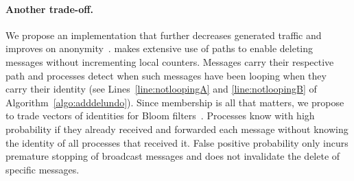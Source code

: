 


\paragraph{Another trade-off.}
We propose an implementation that further decreases generated traffic
and improves on anonymity~\cite{whitaker2002forwarding}.  \NAME makes
extensive use of paths to enable deleting messages without
incrementing local counters. Messages carry their respective path and
processes detect when such messages have been looping when they carry
their identity (see Lines~\ref{line:notloopingA} and
\ref{line:notloopingB} of Algorithm~\ref{algo:adddelundo}). Since
membership is all that matters, we propose to trade vectors of
identities for Bloom filters~\cite{almeida2007scalable}. Processes
know with high probability if they already received and forwarded each
message without knowing the identity of all processes that received
it.  False positive probability only incurs premature stopping of
broadcast messages and does not invalidate the delete of specific
messages.



